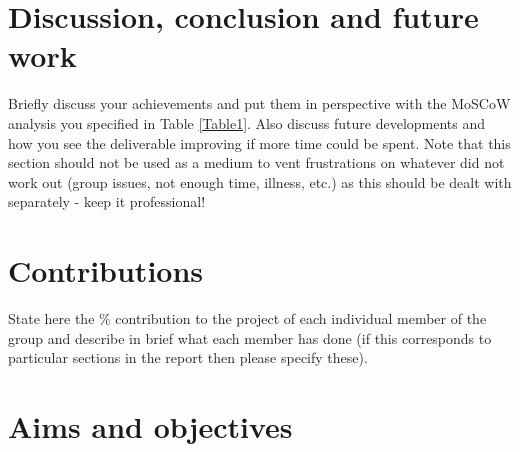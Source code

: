 \documentclass[a4paper, oneside, 11pt]{report}
\begin{document}
\chapter{Discussion, conclusion and future work}

Briefly discuss  your achievements and put them in perspective with the MoSCoW analysis you specified in Table \ref{Table1}. Also discuss future developments and how you see the deliverable improving if more time could be spent. Note that this section should not be used as a medium to vent frustrations on whatever did not work out (group issues, not enough time, illness, etc.) as this should be dealt with separately - keep it professional!



\raggedright



\appendix
\chapter{Contributions}

State here the \% contribution to the project of each individual member of the group and describe in brief what each member has done (if this corresponds to particular sections in the report then please specify these).

\chapter{Aims and objectives}
\end{document}
